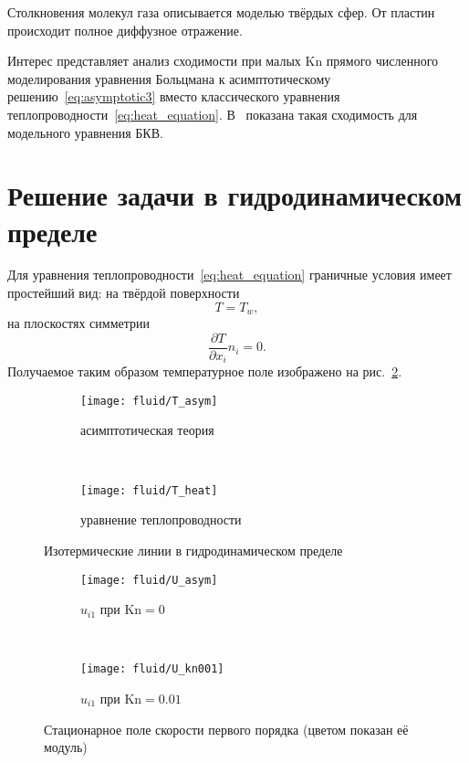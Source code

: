 \documentclass[english,russian,a4paper,12pt]{article}
\newcommand{\Kn}{\mathrm{Kn}}
\newcommand{\pder}[2][]{\frac{\partial#1}{\partial#2}}
\begin{document}
Столкновения молекул газа описывается моделью твёрдых сфер. От пластин происходит полное диффузное отражение. 

Интерес представляет анализ сходимости при малых \(\Kn\) прямого численного моделирования уравнения Больцмана
к асимптотическому решению~\eqref{eq:asymptotic3} вместо классического уравнения теплопроводности~\eqref{eq:heat_equation}.
В~\cite{Bobylev1996} показана такая сходимость для модельного уравнения БКВ.

\section{Решение задачи в гидродинамическом пределе}

Для уравнения теплопроводности~\eqref{eq:heat_equation} граничные условия имеет простейший вид:
на твёрдой поверхности
\[ T = T_w, \]
на плоскостях симметрии
\[ \pder[T]{x_i}n_i = 0. \]
Получаемое таким образом температурное поле изображено на рис.~\ref{fig:isotemp:heat}.

\begin{figure}[ht]
	\centering
	\begin{subfigure}{0.45\textwidth}
		\centering
		\texttt{[image: fluid/T\_asym]}
		\caption{асимптотическая теория}
		\label{fig:isotemp:asym}
	\end{subfigure}
	~
	\begin{subfigure}{0.45\textwidth}
		\centering
		\texttt{[image: fluid/T\_heat]}
		\caption{уравнение теплопроводности}
		\label{fig:isotemp:heat}
	\end{subfigure}
	\caption{Изотермические линии в гидродинамическом пределе}\label{fig:isotemp}
\end{figure}

\begin{figure}[ht]
	\centering
	\begin{subfigure}{0.48\textwidth}
		\centering
		\texttt{[image: fluid/U\_asym]}
		\caption{\(u_{i1}\) при \(\Kn=0\)}\label{fig:velocity:asym}
	\end{subfigure}
	~
	\begin{subfigure}{0.48\textwidth}
		\centering
		\texttt{[image: fluid/U\_kn001]}
		\caption{\(u_{i1}\) при \(\Kn=0.01\) }\label{fig:velocity:asym_kn001}
	\end{subfigure}
	\caption{Стационарное поле скорости первого порядка (цветом показан её модуль)}\label{fig:velocity}
\end{figure}
\end{document}
